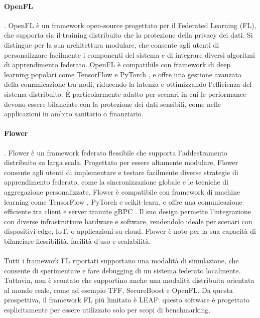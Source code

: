 \documentclass[a4paper, oneside, openright]{report}
\begin{document}
\paragraph{OpenFL} \cite{openfl}. OpenFL è un framework open-source progettato per il Federated Learning (FL), che supporta sia il training distribuito che la protezione della privacy dei dati. Si distingue per la sua architettura modulare, che consente agli utenti di personalizzare facilmente i componenti del sistema e di integrare diversi algoritmi di apprendimento federato. OpenFL \cite{openfl} è compatibile con framework di deep learning popolari come TensorFlow \cite{tf} e PyTorch \cite{pytorch}, e offre una gestione avanzata della comunicazione tra nodi, riducendo la latenza e ottimizzando l'efficienza del sistema distribuito. È particolarmente adatto per scenari in cui le performance devono essere bilanciate con la protezione dei dati sensibili, come nelle applicazioni in ambito sanitario o finanziario.

\paragraph{Flower} \cite{flower}.  Flower è un framework federato flessibile che supporta l'addestramento distribuito su larga scala. Progettato per essere altamente modulare, Flower consente agli utenti di implementare e testare facilmente diverse strategie di apprendimento federato, come la sincronizzazione globale e le tecniche di aggregazione personalizzate. Flower è compatibile con framework di machine learning come TensorFlow \cite{tf}, PyTorch \cite{pytorch} e scikit-learn, e offre una comunicazione efficiente tra client e server tramite gRPC \cite{grpc}. Il suo design permette l'integrazione con diverse infrastrutture hardware e software, rendendolo ideale per scenari con dispositivi edge, IoT, o applicazioni su cloud. Flower è noto per la sua capacità di bilanciare flessibilità, facilità d'uso e scalabilità. \\ \\

\noindent Tutti i framework FL riportati supportano una modalità di simulazione, che consente di sperimentare e fare debugging di un sistema federato localmente. Tuttavia, non è scontato che supportino anche una modalità distribuita orientata al mondo reale, come ad esempio TFF, SecureBoost e OpenFL. Da questa prospettiva, il framework FL più limitato è LEAF: questo software è progettato esplicitamente per essere utilizzato solo per scopi di benchmarking.
\end{document}
